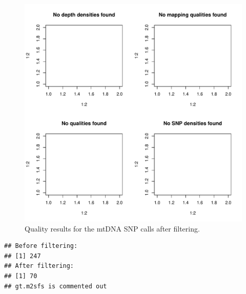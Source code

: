 \documentclass{article}\usepackage[]{graphicx}\usepackage[]{color}
\makeatletter
\def\maxwidth{ %
  \ifdim\Gin@nat@width>\linewidth
    \linewidth
  \else
    \Gin@nat@width
  \fi
}
\newenvironment{kframe}{%
 \def\at@end@of@kframe{}%
 \ifinner\ifhmode%
  \def\at@end@of@kframe{\end{minipage}}%
  \begin{minipage}{\columnwidth}%
 \fi\fi%
 \def\FrameCommand##1{\hskip\@totalleftmargin \hskip-\fboxsep
 \colorbox{shadecolor}{##1}\hskip-\fboxsep
     \hskip-\linewidth \hskip-\@totalleftmargin \hskip\columnwidth}%
 \MakeFramed {\advance\hsize-\width
   \@totalleftmargin\z@ \linewidth\hsize
   \@setminipage}}%
 {\par\unskip\endMakeFramed%
 \at@end@of@kframe}
\newenvironment{knitrout}{}{} %
\makeatother
\begin{document}
\begin{knitrout}
\color{fgcolor}\begin{figure}[H!]

\includegraphics[width=\maxwidth]{figure/plot_filter} \caption[Quality results for the mtDNA SNP calls after filtering]{Quality results for the mtDNA SNP calls after filtering.\label{fig:plot_filter}}
\end{figure}


\end{knitrout}


\begin{knitrout}
\color{fgcolor}\begin{kframe}
\begin{verbatim}
## Before filtering:
## [1] 247
## After filtering:
## [1] 70
## gt.m2sfs is commented out
\end{verbatim}
\end{kframe}
\end{knitrout}
\end{document}
